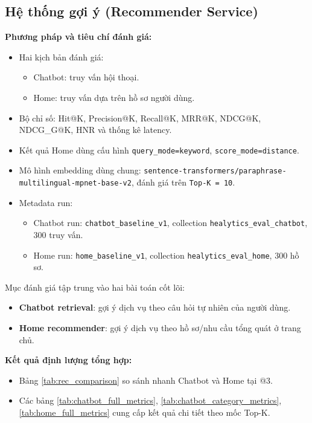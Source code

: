 \subsection{Hệ thống gợi ý (Recommender Service)}

\textbf{Phương pháp và tiêu chí đánh giá:}

\begin{itemize}
    \item Hai kịch bản đánh giá:
    \begin{itemize}
        \item Chatbot: truy vấn hội thoại.
        \item Home: truy vấn dựa trên hồ sơ người dùng.
    \end{itemize}
    \item Bộ chỉ số: Hit@K, Precision@K, Recall@K, MRR@K, NDCG@K, NDCG\_G@K, HNR và thống kê latency.
    \item Kết quả Home dùng cấu hình \texttt{query\_mode=keyword}, \texttt{score\_mode=distance}.
    \item Mô hình embedding dùng chung: \texttt{sentence-transformers/paraphrase-multilingual-mpnet-base-v2}, đánh giá trên \texttt{Top-K = 10}.
    \item Metadata run:
    \begin{itemize}
        \item Chatbot run: \texttt{chatbot\_baseline\_v1}, collection \texttt{healytics\_eval\_chatbot}, 300 truy vấn.
        \item Home run: \texttt{home\_baseline\_v1}, collection \texttt{healytics\_eval\_home}, 300 hồ sơ.
    \end{itemize}
\end{itemize}

Mục đánh giá tập trung vào hai bài toán cốt lõi:
\begin{itemize}
    \item \textbf{Chatbot retrieval}: gợi ý dịch vụ theo câu hỏi tự nhiên của người dùng.
    \item \textbf{Home recommender}: gợi ý dịch vụ theo hồ sơ/nhu cầu tổng quát ở trang chủ.
\end{itemize}

\textbf{Kết quả định lượng tổng hợp:}

\begin{itemize}
    \item Bảng \ref{tab:rec_comparison} so sánh nhanh Chatbot và Home tại @3.
    \item Các bảng \ref{tab:chatbot_full_metrics}, \ref{tab:chatbot_category_metrics}, \ref{tab:home_full_metrics} cung cấp kết quả chi tiết theo mốc Top-K.
\end{itemize}

